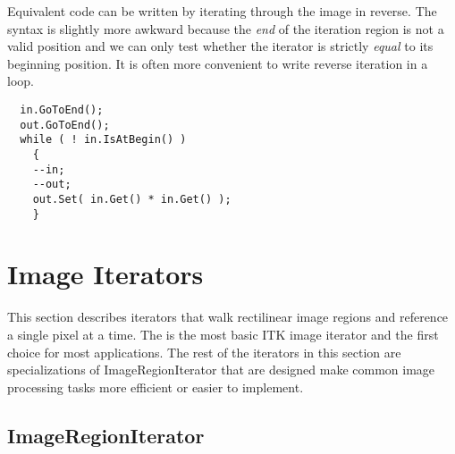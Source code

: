Equivalent code can be written by iterating through the image in reverse.
The syntax is slightly more awkward because the \emph{end} of the
iteration region is not a valid position and we can only test whether the
iterator is strictly \emph{equal} to its beginning position.  It is often more
convenient to write reverse iteration in a  loop.

\small
\begin{verbatim}
  in.GoToEnd();
  out.GoToEnd();
  while ( ! in.IsAtBegin() )
    {
    --in;
    --out;
    out.Set( in.Get() * in.Get() );
    }
\end{verbatim}
\normalsize





\section{Image Iterators}
\label{sec:ImageIterators}
This section describes iterators that walk rectilinear image regions and
reference a single pixel at a time.  The  is the
most basic ITK image iterator and the first choice for most applications. The
rest of the iterators in this section are specializations of
ImageRegionIterator that are designed make common image processing
tasks more efficient or easier to implement.


\subsection{ImageRegionIterator}
\label{sec:itkImageRegionIterator}


